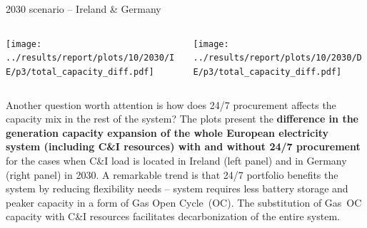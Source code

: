 \begin{frame}{2030 scenario -- Ireland \& Germany}

  {\footnotesize

  \begin{columns}
  \begin{column}{7cm}
  \centering
  \texttt{[image: ../results/report/plots/10/2030/IE/p3/total\_capacity\_diff.pdf]}
  \end{column}

  \begin{column}{8cm}
  \centering
  \texttt{[image: ../results/report/plots/10/2030/DE/p3/total\_capacity\_diff.pdf]}
  \end{column}

  \end{columns}

  \begin{columns}
  \begin{column}{15cm}

  Another question worth attention is how does 24/7 procurement affects the capacity mix 
  in the rest of the system? The plots present the {\bf difference
  in the generation capacity expansion of the whole European electricity system (including C\&I resources)
  with and without 24/7 procurement} for the cases when C\&I load is located in Ireland (left panel) and 
  in Germany (right panel) in 2030.
  A remarkable trend is that 24/7 portfolio benefits the system by \alert{reducing flexibility needs} -- system requires 
  less battery storage and peaker capacity in a form of Gas Open Cycle~(OC). 
  The substitution of Gas~OC capacity with C\&I 
  resources \alert{facilitates decarbonization} of the entire system.

  \end{column}
  \end{columns}
  }

\end{frame}



